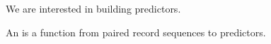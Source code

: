 

We are interested in building predictors.


An  is a function
from
paired record sequences
to
predictors.
